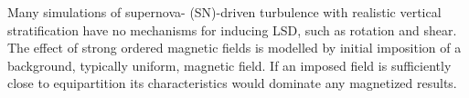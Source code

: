 \documentclass[preprint2]{aastex63}
\begin{document}
 Many simulations of supernova- (SN)-driven turbulence with realistic vertical
 stratification \citep[e.g.,][]{deAvillez:2005,PO07,Hill:2012a,HI14} have no
 mechanisms for inducing LSD, such as rotation and shear.
 The effect of strong ordered magnetic fields is modelled by initial imposition of a
 background, typically uniform, magnetic field.
 If an imposed field is sufficiently close to equipartition its characteristics
 would dominate any magnetized results.
%
\end{document}
